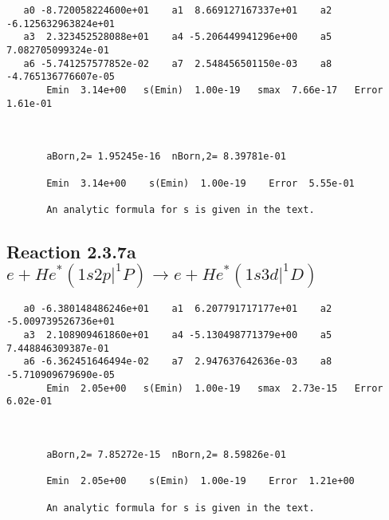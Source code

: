 \documentclass[12pt]{article}
\begin{document}
\begin{small}\begin{verbatim}
   a0 -8.720058224600e+01    a1  8.669127167337e+01    a2 -6.125632963824e+01
   a3  2.323452528088e+01    a4 -5.206449941296e+00    a5  7.082705099324e-01
   a6 -5.741257577852e-02    a7  2.548456501150e-03    a8 -4.765136776607e-05
       Emin  3.14e+00   s(Emin)  1.00e-19   smax  7.66e-17   Error  1.61e-01



       aBorn,2= 1.95245e-16  nBorn,2= 8.39781e-01

       Emin  3.14e+00    s(Emin)  1.00e-19    Error  5.55e-01

       An analytic formula for s is given in the text.
\end{verbatim}\end{small}






                              


\newpage
\subsection{
Reaction 2.3.7a $e + He^*(1s2p|^1P) \rightarrow e + He^*(1s3d|^1D)$}

















\begin{small}\begin{verbatim}
   a0 -6.380148486246e+01    a1  6.207791717177e+01    a2 -5.009739526736e+01
   a3  2.108909461860e+01    a4 -5.130498771379e+00    a5  7.448846309387e-01
   a6 -6.362451646494e-02    a7  2.947637642636e-03    a8 -5.710909679690e-05
       Emin  2.05e+00   s(Emin)  1.00e-19   smax  2.73e-15   Error  6.02e-01



       aBorn,2= 7.85272e-15  nBorn,2= 8.59826e-01

       Emin  2.05e+00    s(Emin)  1.00e-19    Error  1.21e+00

       An analytic formula for s is given in the text.
\end{verbatim}\end{small}
\end{document}
